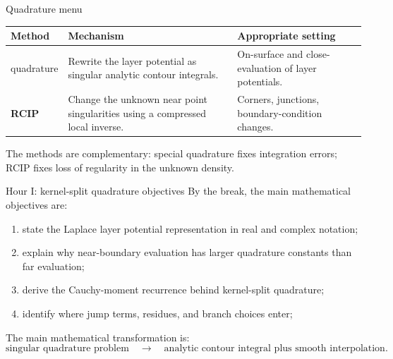 \documentclass[aspectratio=169,11pt]{beamer}
\newcommand{\hl}[1]{{\color{CCMorange}\textbf{#1}}}
\begin{document}
\begin{frame}{Quadrature menu}
\scriptsize
\begin{tabular}{@{}>{\raggedright\arraybackslash}p{}>{\raggedright\arraybackslash}p{}>{\raggedright\arraybackslash}p{}@{}}
\toprule
Method & Mechanism & Appropriate setting \\
\midrule
\hl{Kernel-split} quadrature &
Rewrite the layer potential as singular analytic contour integrals. &
On-surface and close-evaluation of layer potentials. \\
\addlinespace
\hl{RCIP} &
Change the unknown near point singularities using a compressed local inverse. &
Corners, junctions, boundary-condition changes. \\
\bottomrule
\end{tabular}

\vspace{0.5mm}
The methods are complementary: special quadrature fixes integration errors;
RCIP fixes loss of regularity in the unknown density.
\end{frame}

\begin{frame}{Hour I: kernel-split quadrature objectives}
\small
By the break, the main mathematical objectives are:
\begin{enumerate}
  \item state the Laplace layer potential representation in real and complex notation;
  \item explain why near-boundary evaluation has larger quadrature constants than far evaluation;
  \item derive the Cauchy-moment recurrence behind kernel-split quadrature;
  \item identify where jump terms, residues, and branch choices enter;
\end{enumerate}

\vspace{2mm}
The main mathematical transformation is:
\[
  \text{singular quadrature problem}
  \quad\longrightarrow\quad
  \text{analytic contour integral plus smooth interpolation}.
\]
\end{frame}
\end{document}

